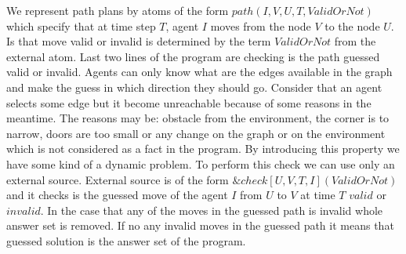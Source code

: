 \documentclass[a4paper, titlepage]{article}
\newcommand{\ext}[3]{\ensuremath{\&{#1}[#2](#3)}}
\begin{document}
We represent path plans by atoms of the form 
$\mathit{path(I, V, U, T, ValidOrNot)}$ which specify that 
at time step $T$, agent $I$ moves from the node $V$ to the 
node $U$. Is that move valid or invalid is determined by 
the term $\mathit{ValidOrNot}$ from the external atom. Last 
two lines of the program are checking is the path guessed 
valid or invalid. Agents can only know what are the edges 
available in the graph and make the guess in which 
direction they should go. Consider that an agent selects 
some 
edge but it become unreachable because of some reasons in the meantime. 
The reasons may be: obstacle from the environment, the 
corner is to narrow, doors are too small or any change on 
the graph or on the environment which is not considered as 
a fact in the program. By introducing this property we have 
some kind of a dynamic problem. To perform this check we 
can use only an external source. External source is of the 
form \ext{check}{U,V,T,I}{ValidOrNot} and it checks is the 
guessed move of the agent $I$ from $U$ to $V$ at time $T$ 
$\mathit{valid}$ or $\mathit{invalid}$. In the case that 
any of the moves in the guessed path is invalid whole 
answer set is removed. If no 
any invalid moves in the guessed path it means that guessed 
solution is the answer set of the program.            
\end{document}
